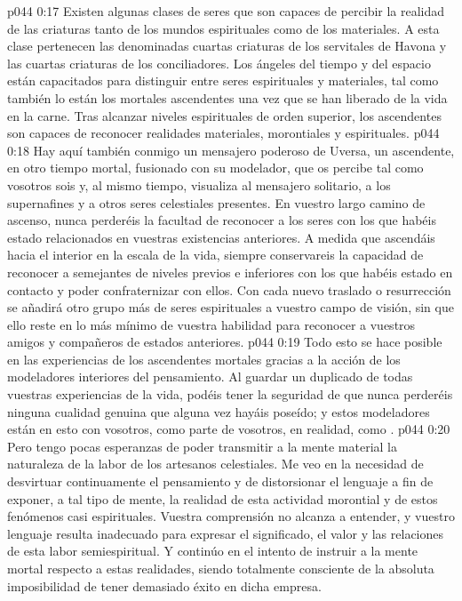 \vs p044 0:17 Existen algunas clases de seres que son capaces de percibir la realidad de las criaturas tanto de los mundos espirituales como de los materiales. A esta clase pertenecen las denominadas cuartas criaturas de los servitales de Havona y las cuartas criaturas de los conciliadores. Los ángeles del tiempo y del espacio están capacitados para distinguir entre seres espirituales y materiales, tal como también lo están los mortales ascendentes una vez que se han liberado de la vida en la carne. Tras alcanzar niveles espirituales de orden superior, los ascendentes son capaces de reconocer realidades materiales, morontiales y espirituales.
\vs p044 0:18 Hay aquí también conmigo un mensajero poderoso de Uversa, un ascendente, en otro tiempo mortal, fusionado con su modelador, que os percibe tal como vosotros sois y, al mismo tiempo, visualiza al mensajero solitario, a los supernafines y a otros seres celestiales presentes. En vuestro largo camino de ascenso, nunca perderéis la facultad de reconocer a los seres con los que habéis estado relacionados en vuestras existencias anteriores. A medida que ascendáis hacia el interior en la escala de la vida, siempre conservareis la capacidad de reconocer a semejantes de niveles previos e inferiores con los que habéis estado en contacto y poder confraternizar con ellos. Con cada nuevo traslado o resurrección se añadirá otro grupo más de seres espirituales a vuestro campo de visión, sin que ello reste en lo más mínimo de vuestra habilidad para reconocer a vuestros amigos y compañeros de estados anteriores.
\vs p044 0:19 Todo esto se hace posible en las experiencias de los ascendentes mortales gracias a la acción de los modeladores interiores del pensamiento. Al guardar un duplicado de todas vuestras experiencias de la vida, podéis tener la seguridad de que nunca perderéis ninguna cualidad genuina que alguna vez hayáis poseído; y estos modeladores están en esto con vosotros, como parte de vosotros, en realidad, como .
\vs p044 0:20 Pero tengo pocas esperanzas de poder transmitir a la mente material la naturaleza de la labor de los artesanos celestiales. Me veo en la necesidad de desvirtuar continuamente el pensamiento y de distorsionar el lenguaje a fin de exponer, a tal tipo de mente, la realidad de esta actividad morontial y de estos fenómenos casi espirituales. Vuestra comprensión no alcanza a entender, y vuestro lenguaje resulta inadecuado para expresar el significado, el valor y las relaciones de esta labor semiespiritual. Y continúo en el intento de instruir a la mente mortal respecto a estas realidades, siendo totalmente consciente de la absoluta imposibilidad de tener demasiado éxito en dicha empresa.
